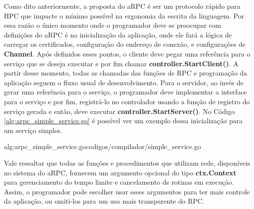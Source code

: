 Como dito anteriormente, a proposta do aRPC é ser um protocolo rápido para HPC que impacte o mínimo possível na ergonomia da escrita da linguagem. Por essa razão o único momento onde o programador deve se preocupar com definições do aRPC é na inicialização da aplicação, onde ele fará a lógica de carregar os certificados, configuração do endereço de conexão, e configurações de \textbf{Channel}. Após definidos esses pontos, o cliente deve pegar uma referência para o serviço que se deseja executar e por fim chamar \textbf{controller.StartClient()}. A partir desse momento, todas as chamadas das funções de RPC e programação da aplicação seguem o fluxo usual de desenvolvimento. Para o servidor, ao invés de gerar uma referência para o serviço, o programador deve implementar a interface para o serviço e por fim, registrá-lo no controlador usando a função de registro do serviço gerada e então, deve executar \textbf{controller.StartServer()}. No Código \ref{alg:arpc_simple_service.go} é possível ver um exemplo dessa inicialização para um serviço simples. 

 {alg:arpc_simple_service.go}{codigos/compilador/simple_service.go}{}


Vale ressaltar que todas as funções e procedimentos que utilizam rede, disponíveis no sistema do aRPC, fornecem um argumento opcional do tipo \textbf{ctx.Context} para gerenciamento do tempo limite e cancelamento de rotinas em execução. Assim, o programador pode escolher usar esses argumentos para ter mais controle da aplicação, ou omiti-los para um uso mais transparente do RPC.
